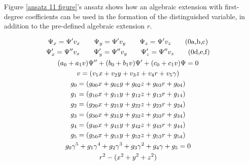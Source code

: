 \documentclass{article}
\theoremstyle{definition}
\theoremstyle{plain}
\begin{document}
Figure \ref{ansatz 11 figure}'s ansatz shows how an algebraic extension with first-degree coefficients
can be used in the formation of the distinguished variable, in addition to the pre-defined algebraic extension $r$.

\begin{subequations}
\label{ansatz 11 plus}
\begin{gather}
\Psi_x = \Psi' v_x \qquad
\Psi_y = \Psi' v_y \qquad
\Psi_z = \Psi' v_z \stepcounter{equation}\stepcounter{equation}\stepcounter{equation}\tag{\arabic{parentequation}a,b,c} \\
\Psi'_x = \Psi'' v_x \qquad
\Psi'_y = \Psi'' v_y \qquad
\Psi'_z = \Psi'' v_z \stepcounter{equation}\stepcounter{equation}\stepcounter{equation}\tag{\arabic{parentequation}d,e,f} \\
(a_0 + a_1 v) \Psi'' + (b_0 + b_1 v) \Psi' + (c_0 + c_1 v) \Psi = 0 \label{ansatz 11 plus:1} \\
v = (v_1 x + v_2 y + v_3 z + v_4 r + v_5 \gamma) \label{ansatz 11 plus:2} \\
g_0 = (g_{00} x + g_{01} y + g_{02} z + g_{03} r + g_{04}) \\
g_1 = (g_{10} x + g_{11} y + g_{12} z + g_{13} r + g_{14}) \\
g_2 = (g_{20} x + g_{21} y + g_{22} z + g_{23} r + g_{24}) \\
g_3 = (g_{30} x + g_{31} y + g_{32} z + g_{33} r + g_{34}) \\
g_4 = (g_{40} x + g_{41} y + g_{42} z + g_{43} r + g_{44}) \\
g_5 = (g_{50} x + g_{51} y + g_{52} z + g_{53} r + g_{54}) \\
g_0 \gamma^5 + g_1 \gamma^4 + g_2 \gamma^3 + g_3 \gamma^2 + g_4 \gamma + g_5 = 0 \\
r^2 - (x^2 + y^2 + z^2)
\end{gather}
\end{subequations}

\vfill\eject
\end{document}
